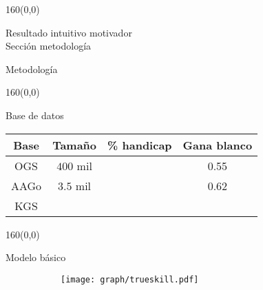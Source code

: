 \documentclass[shownotes,aspectratio=169]{beamer}
\begin{document}
\begin{frame}[plain]
\begin{textblock}{160}(0,0)
\begin{center}
 \Large Resultado intuitivo motivador \\ \large Secci\'on metodolog\'ia
\end{center}
\end{textblock}

 
\end{frame}

\begin{frame}[plain]
 \centering
 \LARGE Metodolog\'ia
 
\end{frame}


\begin{frame}[plain]
\begin{textblock}{160}(0,0)
\begin{center}
 \Large Base de datos
\end{center}
\end{textblock}

\begin{table}
\begin{tabular}{|c|c|c|c|} \hline
 Base & Tama\~no & \% handicap & Gana blanco \\ \hline
 OGS & $400$ mil &  & 0.55 \\ \hline
 AAGo & $3.5$ mil &  & 0.62 \\ \hline
 KGS &  & & \\ \hline
\end{tabular}
\end{table}


\end{frame}



\begin{frame}[plain]
\begin{textblock}{160}(0,0)
\begin{center}
 \Large Modelo básico
\end{center}
\end{textblock}

 \begin{figure}[H]     
     \centering
     \begin{subfigure}[b]{0.75\textwidth}
       \texttt{[image: graph/trueskill.pdf]} 
     \end{subfigure}
   \end{figure} 
  
\end{frame}
\end{document}
